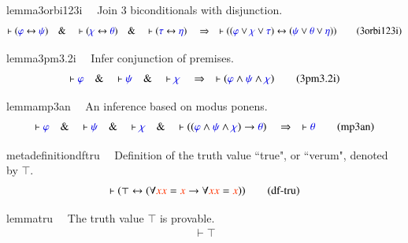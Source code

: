 \begin{restatable}{lemma}{3orbi123i}~~ Join 3 biconditionals with disjunction. 
~
\begin{align}
\vdash ( \mw{\varphi} \leftrightarrow \mw{\psi} )\quad\&\quad \vdash (
    \mw{\chi} \leftrightarrow \mw{\theta} )\quad\&\quad \vdash ( \mw{\tau}
    \leftrightarrow \mw{\eta} )\quad\Rightarrow\quad \vdash ( ( \mw{\varphi}
    \vee \mw{\chi} \vee \mw{\tau} ) \leftrightarrow ( \mw{\psi} \vee
    \mw{\theta} \vee \mw{\eta} ) )\label{eq:3orbi123i}\tag{3orbi123i}
\end{align}
\end{restatable}

\begin{restatable}{lemma}{3pm3.2i}~~ Infer conjunction of premises. 
~
\begin{align}
\vdash \mw{\varphi}\quad\&\quad \vdash \mw{\psi}\quad\&\quad \vdash
    \mw{\chi}\quad\Rightarrow\quad \vdash ( \mw{\varphi} \wedge \mw{\psi}
    \wedge \mw{\chi} )\label{eq:3pm3.2i}\tag{3pm3.2i}
\end{align}
\end{restatable}

\begin{restatable}{lemma}{mp3an}~~ An inference based on modus ponens. 
~
\begin{align}
\vdash \mw{\varphi}\quad\&\quad \vdash \mw{\psi}\quad\&\quad \vdash
    \mw{\chi}\quad\&\quad \vdash ( ( \mw{\varphi} \wedge \mw{\psi} \wedge
    \mw{\chi} ) \rightarrow \mw{\theta} )\quad\Rightarrow\quad \vdash
    \mw{\theta}\label{eq:mp3an}\tag{mp3an}
\end{align}
\end{restatable}

\begin{restatable}{metadefinition}{dftru}~~ Definition of the truth value ``true", or
``verum", denoted by $\top$.
\begin{align}
\vdash ( \top \leftrightarrow ( \forall \msc{x} \msc{x} = \msc{x} \rightarrow
    \forall \msc{x} \msc{x} = \msc{x} ) )\label{eq:df-tru}\tag{df-tru}
\end{align}
\end{restatable}

\begin{restatable}{lemma}{tru}~~ The truth value $\top$ is provable. 
~
\begin{align}
\vdash \top\label{eq:tru}\tag{tru}
\end{align}
\end{restatable}

